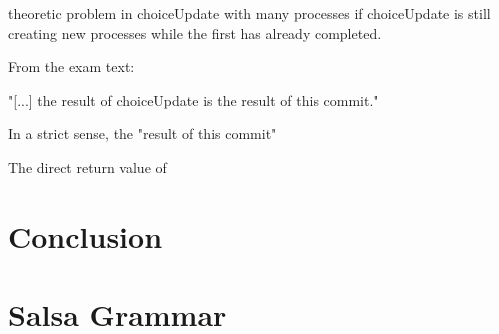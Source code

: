 \documentclass[
paper=a4,
oneside,
fontsize=11pt,
numbers=noenddot,
headinclude=false, %
footinclude=false, %
fleqn,             %
DIV=8
]{scrartcl}
\begin{document}
theoretic problem in choiceUpdate with many processes if choiceUpdate is still
creating new processes while the first has already completed.

From the exam text:

"[...] the result of choiceUpdate is the result of this commit."

In a strict sense, the "result of this commit" 

The direct return value of 

\section{Conclusion}





\appendix

\section{Salsa Grammar}
\end{document}
